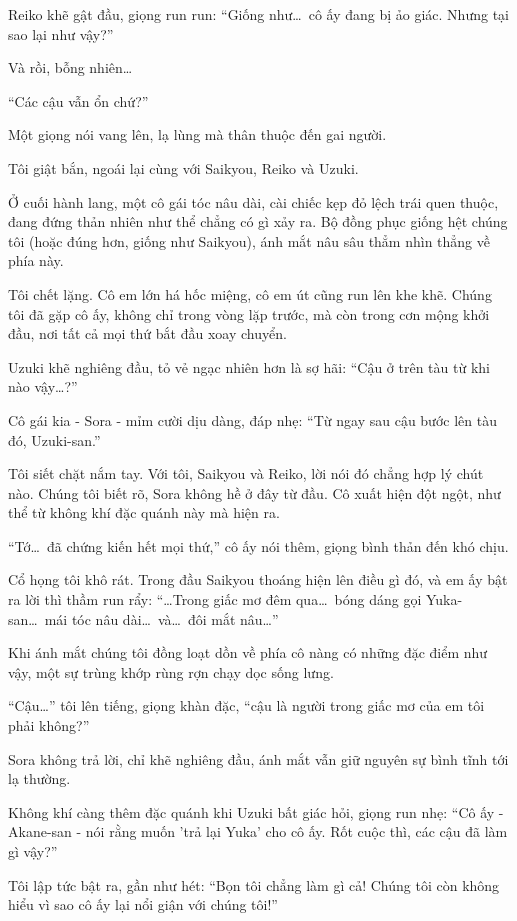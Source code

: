 \documentclass[../main.tex]{subfiles}
\begin{document}
Reiko khẽ gật đầu, giọng run run: ``Giống như\dots\ cô ấy đang bị ảo giác. Nhưng tại sao lại như vậy?''

Và rồi, bỗng nhiên\dots

``Các cậu vẫn ổn chứ?''

Một giọng nói vang lên, lạ lùng mà thân thuộc đến gai người.

Tôi giật bắn, ngoái lại cùng với Saikyou, Reiko và Uzuki.

Ở cuối hành lang, một cô gái tóc nâu dài, cài chiếc kẹp đỏ lệch trái quen thuộc, đang đứng thản nhiên như thể chẳng có gì xảy ra. Bộ đồng phục giống hệt chúng tôi (hoặc đúng hơn, giống như Saikyou), ánh mắt nâu sâu thẳm nhìn thẳng về phía này.

Tôi chết lặng. Cô em lớn há hốc miệng, cô em út cũng run lên khe khẽ. Chúng tôi đã gặp cô ấy, không chỉ trong vòng lặp trước, mà còn trong cơn mộng khởi đầu, nơi tất cả mọi thứ bắt đầu xoay chuyển.

Uzuki khẽ nghiêng đầu, tỏ vẻ ngạc nhiên hơn là sợ hãi: ``Cậu ở trên tàu từ khi nào vậy\dots?''

Cô gái kia - Sora - mỉm cười dịu dàng, đáp nhẹ: ``Từ ngay sau cậu bước lên tàu đó, Uzuki-san.''

Tôi siết chặt nắm tay. Với tôi, Saikyou và Reiko, lời nói đó chẳng hợp lý chút nào. Chúng tôi biết rõ, Sora không hề ở đây từ đầu. Cô xuất hiện đột ngột, như thể từ không khí đặc quánh này mà hiện ra.

``Tớ\dots\ đã chứng kiến hết mọi thứ,'' cô ấy nói thêm, giọng bình thản đến khó chịu.

Cổ họng tôi khô rát. Trong đầu Saikyou thoáng hiện lên điều gì đó, và em ấy bật ra lời thì thầm run rẩy: ``\dots Trong giấc mơ đêm qua\dots\ bóng dáng gọi Yuka-san\dots\ mái tóc nâu dài\dots\ và\dots\ đôi mắt nâu\dots''

Khi ánh mắt chúng tôi đồng loạt dồn về phía cô nàng có những đặc điểm như vậy, một sự trùng khớp rùng rợn chạy dọc sống lưng.

``Cậu\dots'' tôi lên tiếng, giọng khàn đặc, ``cậu là người trong giấc mơ của em tôi phải không?''

Sora không trả lời, chỉ khẽ nghiêng đầu, ánh mắt vẫn giữ nguyên sự bình tĩnh tới lạ thường.

Không khí càng thêm đặc quánh khi Uzuki bất giác hỏi, giọng run nhẹ: ``Cô ấy - Akane-san - nói rằng muốn 'trả lại Yuka' cho cô ấy. Rốt cuộc thì, các cậu đã làm gì vậy?''

Tôi lập tức bật ra, gần như hét: ``Bọn tôi chẳng làm gì cả! Chúng tôi còn không hiểu vì sao cô ấy lại nổi giận với chúng tôi!''
\end{document}
